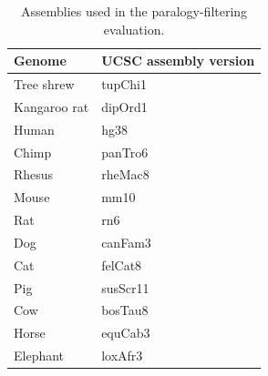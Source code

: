 \documentclass{article}
\begin{document}
\begin{table}
\begin{center}
\begin{tabular}{l|l}
Genome & UCSC assembly version \\
\midrule
Tree shrew & tupChi1 \\
Kangaroo rat & dipOrd1 \\
Human & hg38 \\
Chimp & panTro6 \\
Rhesus & rheMac8 \\
Mouse & mm10 \\
Rat & rn6 \\
Dog & canFam3 \\
Cat & felCat8 \\
Pig & susScr11 \\
Cow & bosTau8 \\
Horse & equCab3 \\
Elephant & loxAfr3 \\
\end{tabular}
\caption{Assemblies used in the paralogy-filtering evaluation.}\label{tab:mapqAssemblies}
\end{center}
\end{table}
\end{document}
